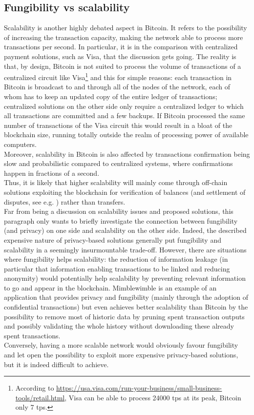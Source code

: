\subsection{Fungibility vs scalability}
\label{sec::fun_vs_scala}
Scalability is another highly debated aspect in Bitcoin. It refers to the possibility of increasing the transaction capacity, making the network able to process more transactions per second. In particular, it is in the comparison with centralized payment solutions, such as Visa, that the discussion gets going. The reality is that, by design, Bitcoin is not suited to process the volume of transactions of a centralized circuit like Visa\footnote{According to \url{https://usa.visa.com/run-your-business/small-business-tools/retail.html}, Visa can be able to process 24000 tps at its peak, Bitcoin only 7 tps.} and this for simple reasons: each transaction in Bitcoin is broadcast to and through all of the nodes of the network, each of whom has to keep an updated copy of the entire ledger of transactions; centralized solutions on the other side only require a centralized ledger to which all transactions are committed and a few backups. If Bitcoin processed the same number of transactions of the Visa circuit this would result in a bloat of the blockchain size, running totally outside the realm of processing power of available computers. \\
Moreover, scalability in Bitcoin is also affected by transactions confirmation being slow and probabilistic compared to centralized systems, where confirmations happen in fractions of a second.\\ Thus, it is likely that higher scalability will mainly come through off-chain solutions exploiting the blockchain for verification of balances (and settlement of disputes, see e.g. \cite{RefWork:18}) rather than transfers.\\
Far from being a discussion on scalability issues and proposed solutions, this paragraph only wants to briefly investigate the connection between fungibility (and privacy) on one side and scalability on the other side. Indeed, the described expensive nature of privacy-based solutions generally put fungibility and scalability in a seemingly insurmountable trade-off. However, there are situations where fungibility helps scalability: the reduction of information leakage (in particular that information enabling transactions to be linked and reducing anonymity) would potentially help scalability by preventing relevant information to go and appear in the blockchain. Mimblewimble \cite{MW} is an example of an application that provides privacy and fungibility (mainly through the adoption of confidential transactions) but even achieves better scalability than Bitcoin by the possibility to remove most of historic data by pruning spent transaction outputs and possibly validating the whole history without downloading these already spent transactions.\\
Conversely, having a more scalable network would obviously favour fungibility and let open the possibility to exploit more expensive privacy-based solutions, but it is indeed difficult to achieve.